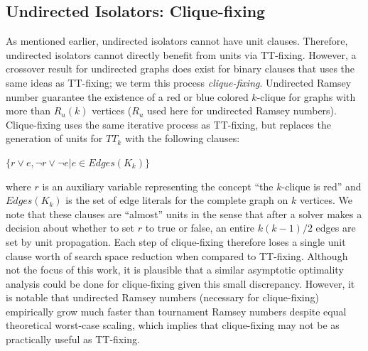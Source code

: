 \documentclass[conference]{IEEEtran}
\begin{document}
\subsection{Undirected Isolators: Clique-fixing}
As mentioned earlier, undirected isolators cannot have unit clauses. Therefore, undirected isolators cannot directly benefit from units via TT-fixing. However, a crossover result for undirected graphs does exist for binary clauses that uses the same ideas as TT-fixing; we term this process \emph{clique-fixing}. Undirected Ramsey number guarantee the existence of a red or blue colored $k$-clique for graphs with more than $R_u(k)$ vertices ($R_u$ used here for undirected Ramsey numbers). Clique-fixing uses the same iterative process as TT-fixing, but replaces the generation of units for $TT_k$ with the following clauses:

$\{r \lor e, \lnot r \lor \lnot e | e \in \mathit{Edges}(K_k)\}$


where $r$ is an auxiliary variable representing the concept ``the $k$-clique is red'' and $\mathit{Edges}(K_k)$ is the set of edge literals for the complete graph on $k$ vertices. We note that these clauses are ``almost'' units in the sense that after a solver makes a decision about whether to set $r$ to true or false, an entire $k(k-1)/2$ edges are set by unit propagation. Each step of clique-fixing therefore loses a single unit clause worth of search space reduction when compared to TT-fixing. Although not the focus of this work, it is plausible that a similar asymptotic optimality analysis could be done for clique-fixing given this small discrepancy. However, it is notable that undirected Ramsey numbers (necessary for clique-fixing) empirically grow much faster than tournament Ramsey numbers despite equal theoretical worst-case scaling, which implies that clique-fixing may not be as practically useful as TT-fixing.


\end{document}
